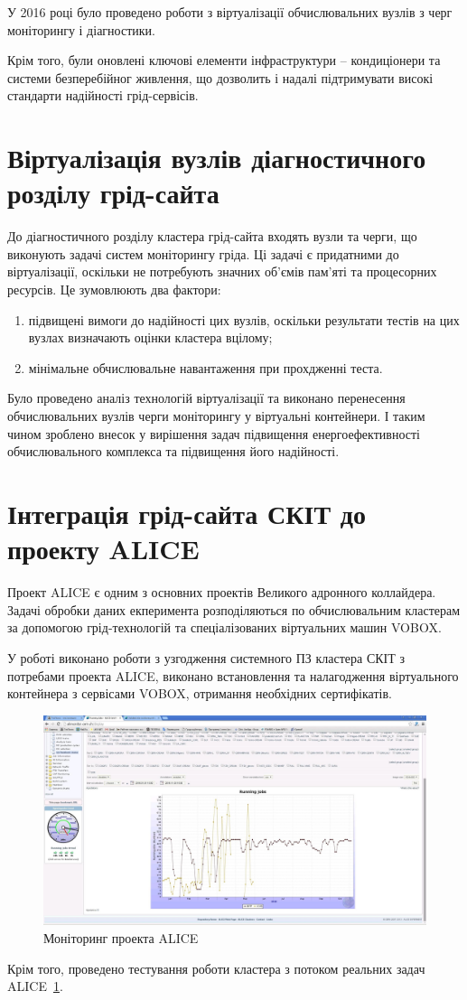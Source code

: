 У 2016 році було проведено роботи з віртуалізації обчислювальних вузлів з черг моніторингу і діагностики.

Крім того, були оновлені ключові елементи інфраструктури -- кондиціонери та системи безперебійног живлення, що дозволить і надалі підтримувати високі стандарти надійності грід-сервісів.


\section{Віртуалізація вузлів діагностичного розділу грід-сайта}

До діагностичного розділу кластера грід-сайта входять вузли та черги, що виконують задачі систем моніторингу гріда. Ці задачі є придатними до віртуалізації, оскільки не потребують значних об'ємів пам'яті та процесорних ресурсів.  Це зумовлюють два фактори: 
\begin{enumerate}
\item підвищені вимоги до надійності цих вузлів, оскільки результати тестів на цих вузлах визначають оцінки кластера вцілому;
\item мінімальне обчислювальне навантаження при прохдженні теста.
\end{enumerate}

Було проведено аналіз технологій віртуалізації та виконано перенесення обчислювальних вузлів черги моніторингу у віртуальні контейнери. І таким чином зроблено внесок у вирішення задач підвищення енергоефективності обчислювального комплекса та підвищення його надійності.


\section{Інтеграція грід-сайта СКІТ до проекту ALICE}

Проект ALICE є одним з основних проектів Великого адронного коллайдера. Задачі обробки даних екперимента розподіляються по обчислювальним кластерам за допомогою грід-технологій та спеціалізованих віртуальних машин VOBOX. 

У роботі виконано роботи з узгодження системного ПЗ кластера СКІТ з потребами проекта ALICE, виконано встановлення та налагодження віртуального контейнера з сервісами VOBOX, отримання необхідних сертифікатів.

\begin{figure}
 \centering
 \includegraphics[width=14cm]{alice-stats.jpg} 
 \caption{Моніторинг проекта ALICE}
 \label{fig:alicemon}
\end{figure}

Крім того, проведено тестування роботи кластера з потоком реальних задач ALICE~\ref{fig:alicemon}.
